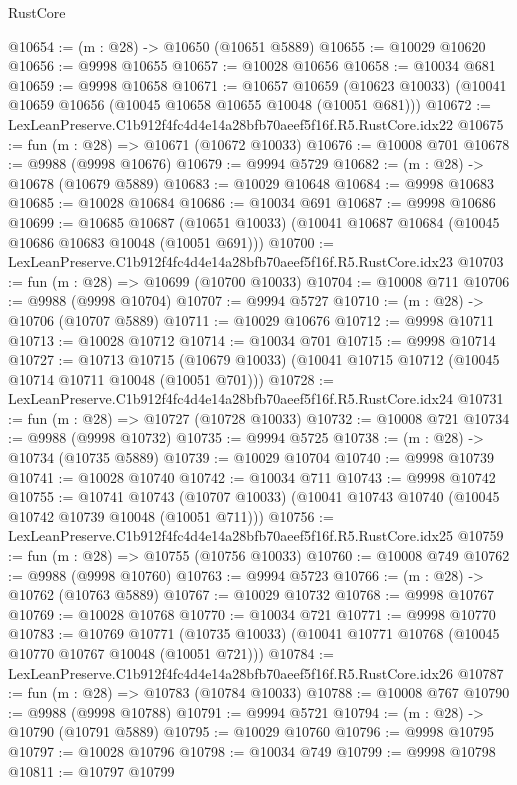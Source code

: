 \begin{lexlean}{RustCore}
\begin{coremodule}
@10654 := (m : @28) -> @10650 (@10651 @5889)
@10655 := @10029 @10620
@10656 := @9998 @10655
@10657 := @10028 @10656
@10658 := @10034 @681
@10659 := @9998 @10658
@10671 := @10657
    @10659
    (@10623 @10033)
    (@10041 @10659 @10656 (@10045 @10658 @10655 @10048 (@10051 @681)))
@10672 := LexLeanPreserve.C1b912f4fc4d4e14a28bfb70aeef5f16f.R5.RustCore.idx22
@10675 := fun (m : @28) => @10671 (@10672 @10033)
@10676 := @10008 @701
@10678 := @9988 (@9998 @10676)
@10679 := @9994 @5729
@10682 := (m : @28) -> @10678 (@10679 @5889)
@10683 := @10029 @10648
@10684 := @9998 @10683
@10685 := @10028 @10684
@10686 := @10034 @691
@10687 := @9998 @10686
@10699 := @10685
    @10687
    (@10651 @10033)
    (@10041 @10687 @10684 (@10045 @10686 @10683 @10048 (@10051 @691)))
@10700 := LexLeanPreserve.C1b912f4fc4d4e14a28bfb70aeef5f16f.R5.RustCore.idx23
@10703 := fun (m : @28) => @10699 (@10700 @10033)
@10704 := @10008 @711
@10706 := @9988 (@9998 @10704)
@10707 := @9994 @5727
@10710 := (m : @28) -> @10706 (@10707 @5889)
@10711 := @10029 @10676
@10712 := @9998 @10711
@10713 := @10028 @10712
@10714 := @10034 @701
@10715 := @9998 @10714
@10727 := @10713
    @10715
    (@10679 @10033)
    (@10041 @10715 @10712 (@10045 @10714 @10711 @10048 (@10051 @701)))
@10728 := LexLeanPreserve.C1b912f4fc4d4e14a28bfb70aeef5f16f.R5.RustCore.idx24
@10731 := fun (m : @28) => @10727 (@10728 @10033)
@10732 := @10008 @721
@10734 := @9988 (@9998 @10732)
@10735 := @9994 @5725
@10738 := (m : @28) -> @10734 (@10735 @5889)
@10739 := @10029 @10704
@10740 := @9998 @10739
@10741 := @10028 @10740
@10742 := @10034 @711
@10743 := @9998 @10742
@10755 := @10741
    @10743
    (@10707 @10033)
    (@10041 @10743 @10740 (@10045 @10742 @10739 @10048 (@10051 @711)))
@10756 := LexLeanPreserve.C1b912f4fc4d4e14a28bfb70aeef5f16f.R5.RustCore.idx25
@10759 := fun (m : @28) => @10755 (@10756 @10033)
@10760 := @10008 @749
@10762 := @9988 (@9998 @10760)
@10763 := @9994 @5723
@10766 := (m : @28) -> @10762 (@10763 @5889)
@10767 := @10029 @10732
@10768 := @9998 @10767
@10769 := @10028 @10768
@10770 := @10034 @721
@10771 := @9998 @10770
@10783 := @10769
    @10771
    (@10735 @10033)
    (@10041 @10771 @10768 (@10045 @10770 @10767 @10048 (@10051 @721)))
@10784 := LexLeanPreserve.C1b912f4fc4d4e14a28bfb70aeef5f16f.R5.RustCore.idx26
@10787 := fun (m : @28) => @10783 (@10784 @10033)
@10788 := @10008 @767
@10790 := @9988 (@9998 @10788)
@10791 := @9994 @5721
@10794 := (m : @28) -> @10790 (@10791 @5889)
@10795 := @10029 @10760
@10796 := @9998 @10795
@10797 := @10028 @10796
@10798 := @10034 @749
@10799 := @9998 @10798
@10811 := @10797
    @10799

\end{coremodule}
\end{lexlean}
